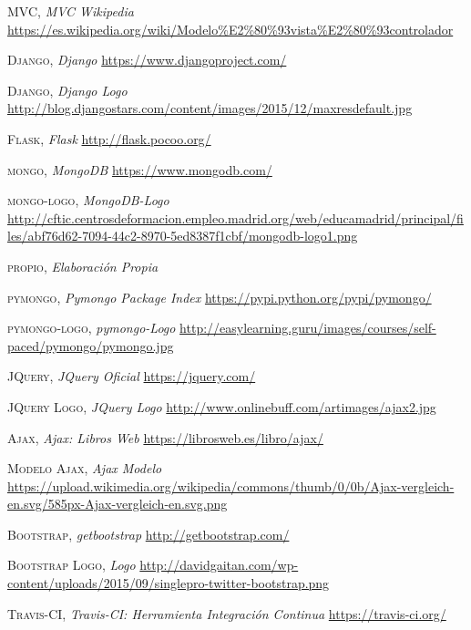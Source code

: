 \documentclass[a4paper,11pt]{book}
\begin{document}
\begin{thebibliography}{aaaa}
 \textsc{MVC},
\textit{MVC Wikipedia}
\url{https://es.wikipedia.org/wiki/Modelo%E2%80%93vista%E2%80%93controlador}

 \textsc{Django},
\textit{Django}
\url{https://www.djangoproject.com/}

 \textsc{Django},
\textit{Django Logo}
\url{http://blog.djangostars.com/content/images/2015/12/maxresdefault.jpg}

 \textsc{Flask},
\textit{Flask}
\url{http://flask.pocoo.org/}

 \textsc{mongo},
\textit{MongoDB}
\url{https://www.mongodb.com/}

 \textsc{mongo-logo},
\textit{MongoDB-Logo}
\url{http://cftic.centrosdeformacion.empleo.madrid.org/web/educamadrid/principal/files/abf76d62-7094-44c2-8970-5ed8387f1cbf/mongodb-logo1.png}

 \textsc{propio},
\textit{Elaboración Propia}
\url{}

 \textsc{pymongo},
\textit{Pymongo Package Index }
\url{https://pypi.python.org/pypi/pymongo/}

 \textsc{pymongo-logo},
\textit{pymongo-Logo}
\url{http://easylearning.guru/images/courses/self-paced/pymongo/pymongo.jpg}

 \textsc{JQuery},
\textit{JQuery Oficial}
\url{https://jquery.com/}

 \textsc{JQuery Logo},
\textit{JQuery Logo}
\url{http://www.onlinebuff.com/artimages/ajax2.jpg}

 \textsc{Ajax},
\textit{Ajax: Libros Web}
\url{https://librosweb.es/libro/ajax/}

 \textsc{Modelo Ajax},
\textit{Ajax Modelo}
\url{https://upload.wikimedia.org/wikipedia/commons/thumb/0/0b/Ajax-vergleich-en.svg/585px-Ajax-vergleich-en.svg.png}



 \textsc{Bootstrap},
\textit{getbootstrap}
\url{http://getbootstrap.com/}

 \textsc{Bootstrap Logo},
\textit{Logo}
\url{http://davidgaitan.com/wp-content/uploads/2015/09/singlepro-twitter-bootstrap.png}





 \textsc{Travis-CI},
\textit{Travis-CI: Herramienta Integración Continua}
\url{https://travis-ci.org/}


\end{thebibliography}
\end{document}
